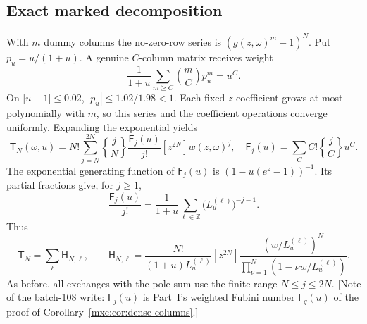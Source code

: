 \documentclass[11pt]{article}
\numberwithin{equation}{section}
\theoremstyle{definition}
\theoremstyle{remark}
\newcommand{\StirTwo}[2]{\genfrac{\{} {\}}{0pt}{}{#1}{#2}}
\begin{document}
\subsection{Exact marked decomposition}
With $m$ dummy columns the no-zero-row series is $(g(z,\omega)^m-1)^N$. Put
$p_u=u/(1+u)$. A genuine $C$-column matrix receives weight
\[
 \frac1{1+u}\sum_{m\ge C}\binom mC p_u^m=u^C.
\]
On $|u-1|\le0.02$, $|p_u|\le1.02/1.98<1$. Each fixed $z$ coefficient grows at
most polynomially with $m$, so this series and the coefficient operations
converge uniformly. Expanding the exponential yields
\begin{equation}\label{mxc:pm:eq:markedfinite}
 \mathsf T_N(\omega,u)=N!\sum_{j=N}^{2N}\StirTwo jN\frac{\mathsf F_j(u)}{j!}
                  [z^{2N}]w(z,\omega)^j,
 \quad \mathsf F_j(u)=\sum_C C!\StirTwo jC u^C.
\end{equation}
The exponential generating function of $\mathsf F_j(u)$ is
$(1-u(e^z-1))^{-1}$. Its partial fractions give, for $j\ge1$,
\[
 \frac{\mathsf F_j(u)}{j!}=\frac1{1+u}
      \sum_{\ell\in\mathbb Z}\bigl(L_u^{(\ell)}\bigr)^{-j-1}.
\]
Thus
\begin{equation}\label{mxc:pm:eq:markedpoles}
 \mathsf T_N=\sum_\ell \mathsf H_{N,\ell},\qquad
 \mathsf H_{N,\ell}=\frac{N!}{(1+u)L_u^{(\ell)}}
 [z^{2N}]\frac{(w/L_u^{(\ell)})^N}{\prod_{\nu=1}^N(1-\nu w/L_u^{(\ell)})}.
\end{equation}
As before, all exchanges with the pole sum use the finite range
$N\le j\le2N$. [Note of the batch-108 write: $\mathsf F_j(u)$ is Part~I's
weighted Fubini number $\mathsf F_q(u)$ of the proof of
Corollary~\ref{mxc:cor:dense-columns}.]
\end{document}
